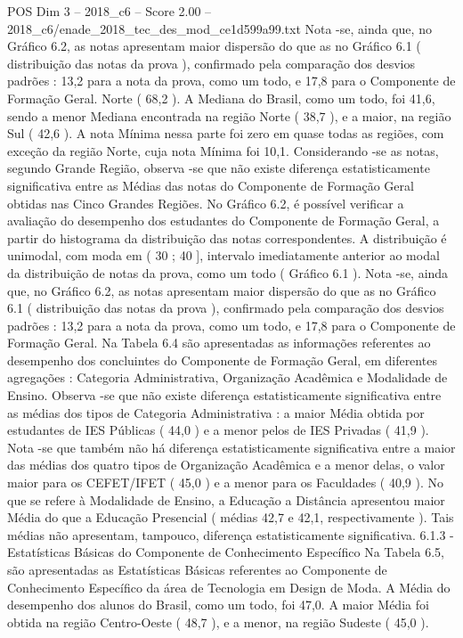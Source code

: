 \begin{textsample}{POS Dim 3 – 2018\_c6 – Score 2.00 – 2018\_c6/enade\_2018\_tec\_des\_mod\_ce1d599a99.txt}
Nota -se, ainda que, no Gráfico 6.2, as notas apresentam maior dispersão do que as no Gráfico 6.1 ( distribuição das notas da prova ), confirmado pela comparação dos desvios padrões : 13,2 para a nota da prova, como um todo, e 17,8 para o Componente de Formação Geral.
Norte ( 68,2 ).
A Mediana do Brasil, como um todo, foi 41,6, sendo a menor Mediana encontrada na região Norte ( 38,7 ), e a maior, na região Sul ( 42,6 ).
A nota Mínima nessa parte foi zero em quase todas as regiões, com exceção da região Norte, cuja nota Mínima foi 10,1.
Considerando -se as notas, segundo Grande Região, observa -se que não existe diferença estatisticamente significativa entre as Médias das notas do Componente de Formação Geral obtidas nas Cinco Grandes Regiões.
No Gráfico 6.2, é possível verificar a avaliação do desempenho dos estudantes do Componente de Formação Geral, a partir do histograma da distribuição das notas correspondentes.
A distribuição é unimodal, com moda em ( 30 ; 40 ], intervalo imediatamente anterior ao modal da distribuição de notas da prova, como um todo ( Gráfico 6.1 ).
Nota -se, ainda que, no Gráfico 6.2, as notas apresentam maior dispersão do que as no Gráfico 6.1 ( distribuição das notas da prova ), confirmado pela comparação dos desvios padrões : 13,2 para a nota da prova, como um todo, e 17,8 para o Componente de Formação Geral.
Na Tabela 6.4 são apresentadas as informações referentes ao desempenho dos concluintes do Componente de Formação Geral, em diferentes agregações : Categoria Administrativa, Organização Acadêmica e Modalidade de Ensino.
Observa -se que não existe diferença estatisticamente significativa entre as médias dos tipos de Categoria Administrativa : a maior Média obtida por estudantes de IES Públicas ( 44,0 ) e a menor pelos de IES Privadas ( 41,9 ).
Nota -se que também não há diferença estatisticamente significativa entre a maior das médias dos quatro tipos de Organização Acadêmica e a menor delas, o valor maior para os CEFET/IFET ( 45,0 ) e a menor para os Faculdades ( 40,9 ).
No que se refere à Modalidade de Ensino, a Educação a Distância apresentou maior Média do que a Educação Presencial ( médias 42,7 e 42,1, respectivamente ).
Tais médias não apresentam, tampouco, diferença estatisticamente significativa. 6.1.3 - Estatísticas Básicas do Componente de Conhecimento Específico Na Tabela 6.5, são apresentadas as Estatísticas Básicas referentes ao Componente de Conhecimento Específico da área de Tecnologia em Design de Moda.
A Média do desempenho dos alunos do Brasil, como um todo, foi 47,0.
A maior Média foi obtida na região Centro-Oeste ( 48,7 ), e a menor, na região Sudeste ( 45,0 ).

\end{textsample}
